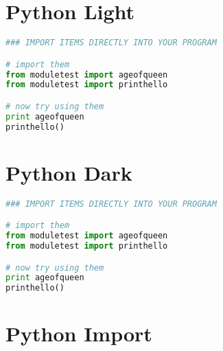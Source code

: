 \section{Python Light}

\begin{lstlisting}[language=python, style=customStylePythonLight, caption=Snippet title]
### IMPORT ITEMS DIRECTLY INTO YOUR PROGRAM

# import them
from moduletest import ageofqueen
from moduletest import printhello

# now try using them
print ageofqueen
printhello()
\end{lstlisting}

\section{Python Dark}

\begin{lstlisting}[language=python, style=customStylePythonDark, caption=Snippet title]
### IMPORT ITEMS DIRECTLY INTO YOUR PROGRAM

# import them
from moduletest import ageofqueen
from moduletest import printhello

# now try using them
print ageofqueen
printhello()
\end{lstlisting}

\section{Python Import}





